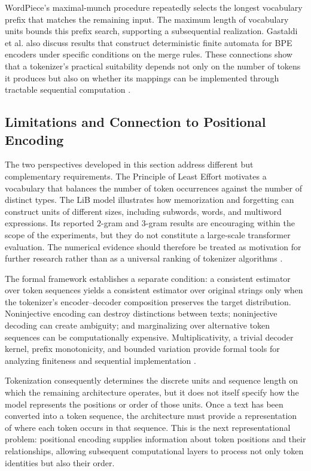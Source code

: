 WordPiece's maximal-munch procedure repeatedly selects the longest vocabulary prefix that matches the remaining input. The maximum length of vocabulary units bounds this prefix search, supporting a subsequential realization. Gastaldi et al. also discuss results that construct deterministic finite automata for BPE encoders under specific conditions on the merge rules. These connections show that a tokenizer's practical suitability depends not only on the number of tokens it produces but also on whether its mappings can be implemented through tractable sequential computation \parencite{gastaldi2025foundations}.

\subsection{Limitations and Connection to Positional Encoding}
\label{subsec:tokenizer-limitations-transition}

The two perspectives developed in this section address different but complementary requirements. The Principle of Least Effort motivates a vocabulary that balances the number of token occurrences against the number of distinct types. The LiB model illustrates how memorization and forgetting can construct units of different sizes, including subwords, words, and multiword expressions. Its reported \(2\)-gram and \(3\)-gram results are encouraging within the scope of the experiments, but they do not constitute a large-scale transformer evaluation. The numerical evidence should therefore be treated as motivation for further research rather than as a universal ranking of tokenizer algorithms \parencite{yang2024rethinking}.

The formal framework establishes a separate condition: a consistent estimator over token sequences yields a consistent estimator over original strings only when the tokenizer's encoder--decoder composition preserves the target distribution. Noninjective encoding can destroy distinctions between texts; noninjective decoding can create ambiguity; and marginalizing over alternative token sequences can be computationally expensive. Multiplicativity, a trivial decoder kernel, prefix monotonicity, and bounded variation provide formal tools for analyzing finiteness and sequential implementation \parencite{gastaldi2025foundations}.

Tokenization consequently determines the discrete units and sequence length on which the remaining architecture operates, but it does not itself specify how the model represents the positions or order of those units. Once a text has been converted into a token sequence, the architecture must provide a representation of where each token occurs in that sequence. This is the next representational problem: positional encoding supplies information about token positions and their relationships, allowing subsequent computational layers to process not only token identities but also their order. 
